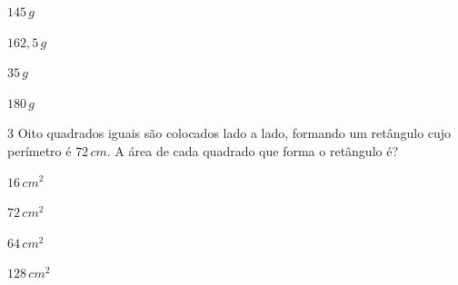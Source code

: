 \begin{escolha}
\item $145\,g$
\item $162,5\,g$
\item $35\,g$
\item $180\,g$
\end{escolha}



\num{3}  Oito quadrados iguais são colocados lado a lado, formando um
retângulo cujo perímetro é $72\,cm$. A área de cada quadrado que forma o
retângulo é?

\begin{escolha}
\item $16\,cm^2$
\item $72\,cm^2$
\item $64\,cm^2$
\item $128\,cm^2$
\end{escolha}


